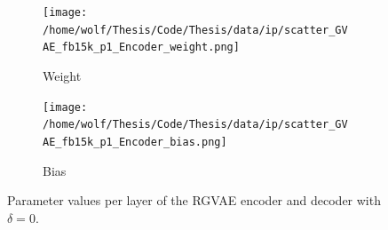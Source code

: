 \begin{figure}[H]
  \centering
  \begin{subfigure}{\textwidth}
    \texttt{[image: /home/wolf/Thesis/Code/Thesis/data/ip/scatter\_GVAE\_fb15k\_p1\_Encoder\_weight.png]}
    \caption{Weight}
    \label{fig5:normParamsW}
  \end{subfigure}
  \begin{subfigure}{\textwidth}
    \texttt{[image: /home/wolf/Thesis/Code/Thesis/data/ip/scatter\_GVAE\_fb15k\_p1\_Encoder\_bias.png]}
    \caption{Bias}
    \label{fig5:normParamsB}
  \end{subfigure}
\caption{Parameter values per layer of the RGVAE encoder and decoder with $\delta=0$.}
\label{fig5:normParams}
\end{figure}
